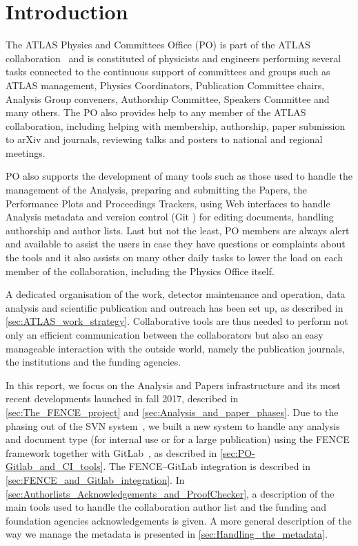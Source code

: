 
\section{Introduction}%
\label{sec:Introduction}

The ATLAS Physics and Committees Office (PO) is part of the ATLAS collaboration~\cite{PERF-2007-01} and is constituted of physicists and engineers performing several tasks connected to the continuous support of committees and groups such as ATLAS management, Physics Coordinators, Publication Committee chairs, Analysis Group conveners, Authorship Committee, Speakers Committee and many others. The PO also provides help to any member of the ATLAS collaboration, including helping with membership, authorship, paper submission to arXiv and journals, reviewing talks and posters to national and regional meetings.

PO also supports the development of many tools such as those used to handle the management of the Analysis, preparing and submitting the Papers, the Performance Plots and Proceedings Trackers, using Web interfaces to handle Analysis metadata and version control (Git \cite{git}) for editing documents, handling authorship and author lists. Last but not the least, PO members are always alert and available to assist the users in case they have questions or complaints about the tools and it also assists on many other daily tasks to lower the load on each member of the collaboration, including the Physics Office itself.

A dedicated organisation of the work, detector maintenance and operation, data analysis and scientific publication and outreach has been set up, as described in \cref{sec:ATLAS_work_strategy}.
Collaborative tools are thus needed to perform not only an efficient communication between the collaborators but also an easy manageable interaction with the outside world, namely the publication journals, the institutions and the funding agencies.

In this report, we focus on the Analysis and Papers infrastructure and its most recent developments launched in fall 2017, described in \cref{sec:The_FENCE_project} and \cref{sec:Analysis_and_paper_phases}.
Due to the phasing out of the SVN system~\cite{svn}, we built a new system to handle any analysis and document type (for internal use or for a large publication) using the FENCE framework  together with GitLab~\cite{gitlab}, as described in \cref{sec:PO-Gitlab_and_CI_tools}.
The FENCE--GitLab integration is described in \cref{sec:FENCE_and_Gitlab_integration}. In \cref{sec:Authorlists_Acknowledgements_and_ProofChecker}, a description of the main tools used to handle the collaboration author list and the funding and foundation agencies acknowledgements is given.
A more general description of the way we manage the metadata is presented in \cref{sec:Handling_the_metadata}.
